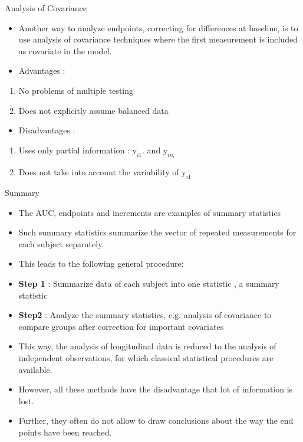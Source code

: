 \documentclass{beamer}
\begin{document}
\begin{frame} {Analysis of Covariance}
\begin{itemize}
	\item Another way to analyze endpoints, correcting for differences at baseline, is to use analysis of covariance techniques where the first measurement is included as covariate in the model. 
\end{itemize}  

\begin{itemize}
	\item Advantages :
\end{itemize}  

\begin{enumerate}
	\item  No problems of multiple testing
	\item Does not explicitly assume balanced data 
\end{enumerate}  

\begin{itemize}
	\item Disadvantages : 
\end{itemize}
\begin{enumerate}
	\item  Uses only partial information : $\mbox{y}_{i1}$. and $\mbox{y}_{in_{i}}$ 
	\item Does not take into account the variability of $ \mbox{y}_{i1} $
\end{enumerate}
\end{frame}

\begin{frame}{Summary}
\begin{itemize}
	\item The AUC, endpoints and increments are examples of summary statistics
	\item Such summary statistics summarize the vector of repeated measurements for each subject  separately.  
	\item This leads to the following general procedure:
	\item \textbf{Step 1} : Summarize data of each subject into one statistic , a summary  statistic\\
	\item \textbf{Step2}  : Analyze the summary statistics, e.g. analysis of covariance to compare groups after correction for important covariates\\
	\item This way, the analysis of longitudinal data is reduced to the analysis of independent observations, for which classical statistical procedures are available.
	\item However, all these methods have the disadvantage that lot of information is lost.
	\item Further, they often do not allow to draw conclusions about the way the end points have been reached.
\end{itemize}
\end{frame}
\end{document}

